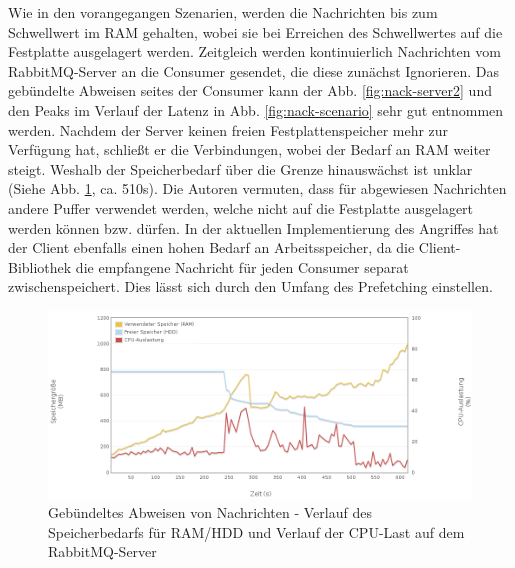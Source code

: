 \documentclass[	a4paper,
			11pt,
			oneside,
			parskip]{scrartcl}
\begin{document}
	
	\clearpage
		{%
		  \newline
		  \newline
		  \newline
		}{%
		 Wie in den vorangegangen Szenarien, werden die Nachrichten bis zum Schwellwert im RAM gehalten, wobei sie bei Erreichen des Schwellwertes auf die Festplatte ausgelagert werden.
		 Zeitgleich werden kontinuierlich Nachrichten vom RabbitMQ-Server an die Consumer gesendet, die diese zunächst Ignorieren. Das gebündelte Abweisen seites der Consumer kann der Abb.
		 \ref{fig:nack-server2} und den Peaks im Verlauf der Latenz in Abb. \ref{fig:nack-scenario} sehr gut entnommen werden. Nachdem der Server keinen freien Festplattenspeicher mehr zur 
		 Verfügung hat, schließt er die Verbindungen, wobei der Bedarf an RAM weiter steigt. Weshalb der Speicherbedarf über die Grenze hinauswächst ist unklar (Siehe Abb. \ref{fig:nack-server1}, ca. 510s).
		 Die Autoren vermuten, dass für abgewiesen Nachrichten andere Puffer verwendet werden, welche nicht auf die Festplatte ausgelagert werden können bzw. dürfen.
		}{
		 In der aktuellen Implementierung des Angriffes hat der Client ebenfalls einen hohen Bedarf an Arbeitsspeicher, da die Client-Bibliothek die empfangene Nachricht für jeden Consumer
		 separat zwischenspeichert. Dies lässt sich durch den Umfang des Prefetching einstellen.
		}
		
		\begin{figure}[!htb]
			\centering
			\includegraphics[width=\textwidth]{img/nack/nack_server1.png}
			\caption{Gebündeltes Abweisen von Nachrichten - Verlauf des Speicherbedarfs für RAM/HDD und Verlauf der CPU-Last auf dem RabbitMQ-Server}
			\label{fig:nack-server1}
		\end{figure}
		
\end{document}
